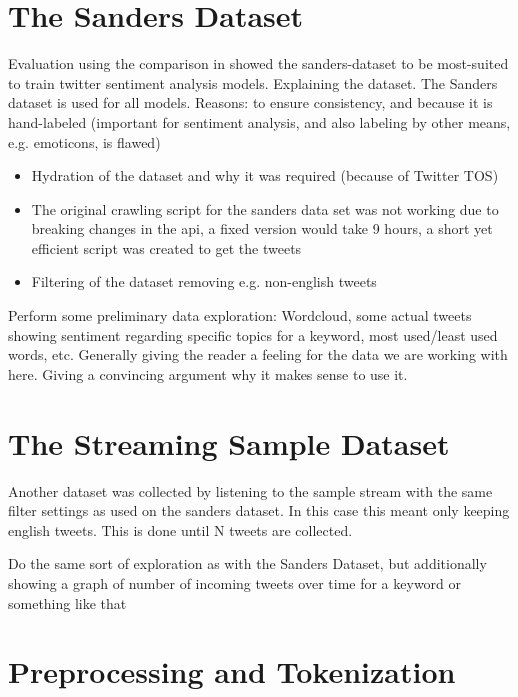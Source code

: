 \section{The Sanders Dataset}
\label{sec:theSandersDataset}

Evaluation using the comparison in \cite{Saif2013} showed the sanders-dataset \cite{sanders} to be most-suited to train twitter sentiment analysis models.
Explaining the dataset.
The Sanders dataset is used for all models.
Reasons: to ensure consistency, and because it is hand-labeled (important for sentiment analysis, and also labeling by other means, e.g. emoticons, is flawed)

\begin{itemize}
    \item
    Hydration of the dataset and why it was required (because of Twitter TOS)
    \item
    The original crawling script for the sanders data set was not working due to breaking changes in the api, a fixed version would take 9 hours, a short yet efficient script was created to get the tweets
    \item
    Filtering of the dataset removing e.g. non-english tweets
\end{itemize}

Perform some preliminary data exploration: Wordcloud, some actual tweets showing sentiment regarding specific topics for a keyword, most used/least used words, etc.
Generally giving the reader a feeling for the data we are working with here.
Giving a convincing argument why it makes sense to use it.

\section{The Streaming Sample Dataset}
\label{sec:streamingSampleDataset}

Another dataset was collected by listening to the sample stream with the same filter settings as used on the sanders dataset.
In this case this meant only keeping english tweets.
This is done until N tweets are collected.

Do the same sort of exploration as with the Sanders Dataset, but additionally showing a graph of number of incoming tweets over time for a keyword or something like that

\section{Preprocessing and Tokenization}
\label{sec:preprocessingAndTokenization}

